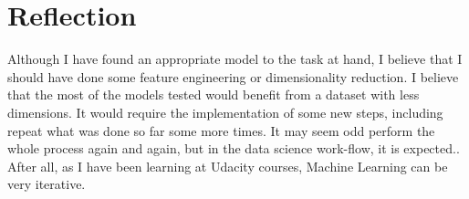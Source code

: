 \documentclass[a4paper]{article}
\begin{document}

\section{Reflection}
Although I have found an appropriate model to the task at hand, I believe that I should have done some feature engineering or dimensionality reduction. I believe that the most of the models tested would benefit from a dataset with less dimensions. It would require the implementation of some new steps, including repeat what was done so far some more times. It may seem odd perform the whole process again and again, but in the data science work-flow, it is expected.. After all, as I have been learning at Udacity courses, Machine Learning can be very iterative.






\end{document}
